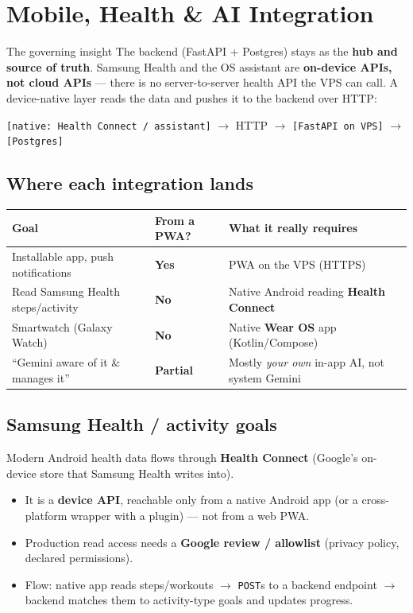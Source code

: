 \documentclass[11pt,a4paper]{article}
\newcommand{\yes}{\textcolor{ok}{\textbf{Yes}}}
\newcommand{\no}{\textcolor{bad}{\textbf{No}}}
\newcommand{\maybe}{\textcolor{warn}{\textbf{Partial}}}
\begin{document}
\section{Mobile, Health \& AI Integration}

\begin{keybox}{The governing insight}
The backend (FastAPI + Postgres) stays as the \textbf{hub and source of truth}.
Samsung Health and the OS assistant are \textbf{on-device APIs, not cloud APIs} ---
there is no server-to-server health API the VPS can call. A device-native layer
reads the data and pushes it to the backend over HTTP:

\medskip
\centering
\texttt{[native: Health Connect / assistant]} $\rightarrow$ HTTP $\rightarrow$ \texttt{[FastAPI on VPS]} $\rightarrow$ \texttt{[Postgres]}
\end{keybox}

\subsection{Where each integration lands}

\begin{center}
\renewcommand{\arraystretch}{1.35}
\begin{tabularx}{\textwidth}{>{\raggedright\arraybackslash}X >{\centering\arraybackslash}p{2.6cm} >{\raggedright\arraybackslash}p{6.2cm}}
\toprule
\textbf{Goal} & \textbf{From a PWA?} & \textbf{What it really requires} \\
\midrule
Installable app, push notifications & \yes & PWA on the VPS (HTTPS) \\
Read Samsung Health steps/activity & \no & Native Android reading \textbf{Health Connect} \\
Smartwatch (Galaxy Watch) & \no & Native \textbf{Wear OS} app (Kotlin/Compose) \\
``Gemini aware of it \& manages it'' & \maybe & Mostly \emph{your own} in-app AI, not system Gemini \\
\bottomrule
\end{tabularx}
\end{center}

\subsection{Samsung Health / activity goals}
Modern Android health data flows through \textbf{Health Connect} (Google's
on-device store that Samsung Health writes into).
\begin{itemize}
  \item It is a \textbf{device API}, reachable only from a native Android app
        (or a cross-platform wrapper with a plugin) --- not from a web PWA.
  \item Production read access needs a \textbf{Google review / allowlist}
        (privacy policy, declared permissions).
  \item Flow: native app reads steps/workouts $\rightarrow$ \texttt{POST}s to a backend
        endpoint $\rightarrow$ backend matches them to activity-type goals and updates progress.
\end{itemize}
\end{document}
